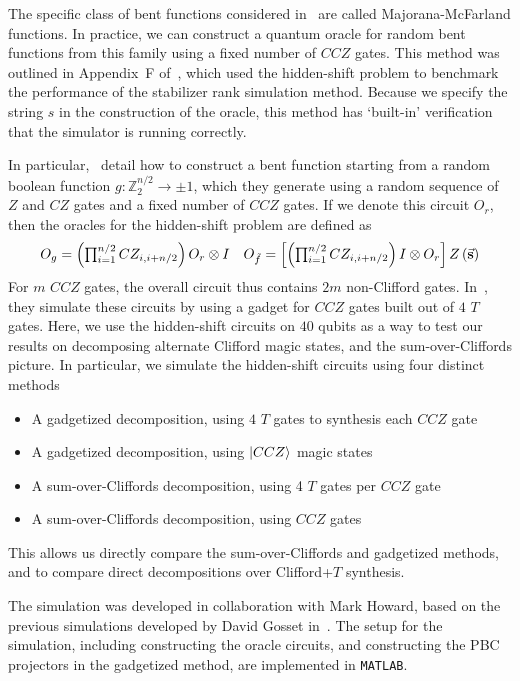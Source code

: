 The specific class of bent functions considered in~\cite{Roetteler2008} are called Majorana-McFarland functions. In practice, we can construct a quantum oracle for random bent functions from this family using a fixed number of $CCZ$ gates. This method was outlined in Appendix~F of~\cite{Bravyi2016}, which used the hidden-shift problem to benchmark the performance of the stabilizer rank simulation method. Because we specify the string $s$ in the construction of the oracle, this method has `built-in' verification that the simulator is running correctly.\par
In particular,~\cite{Bravyi2016} detail how to construct a bent function starting from a random boolean function $g:\mathbb{Z}_{2}^{n/2}\rightarrow \pm 1$, which they generate using a random sequence of $Z$ and $CZ$ gates and a fixed number of $CCZ$ gates. If we denote this circuit $O_{r}$, then the oracles for the hidden-shift problem are defined as
\begin{equation}
\begin{array}{l r}
O_{g} = \left(\prod_{i=1}^{n/2}CZ_{i,i+n/2}\right)O_{r}\otimes I & O_{\tilde{f}} = \left[\left(\prod_{i=1}^{n/2}CZ_{i,i+n/2}\right)I\otimes O_{r}\right] Z\left(\va{s}\right)
\end{array}
\end{equation}
For $m$ $CCZ$ gates, the overall circuit thus contains $2m$ non-Clifford gates. In~\cite{Bravyi2016}, they simulate these circuits by using a gadget for $CCZ$ gates built out of $4$ $T$ gates. Here, we use the hidden-shift circuits on $40$ qubits as a way to test our results on decomposing alternate Clifford magic states, and the sum-over-Cliffords picture. In particular, we simulate the hidden-shift circuits using four distinct methods
\begin{itemize}
    \item A gadgetized decomposition, using $4$ $T$ gates to synthesis each $CCZ$ gate
    \item A gadgetized decomposition, using $\ket{CCZ}$ magic states
    \item A sum-over-Cliffords decomposition, using 4 $T$ gates per $CCZ$ gate
    \item A sum-over-Cliffords decomposition, using $CCZ$ gates
\end{itemize}
This allows us directly compare the sum-over-Cliffords and gadgetized methods, and to compare direct decompositions over Clifford+$T$ synthesis.\par
The simulation was developed in collaboration with Mark Howard, based on the previous simulations developed by David Gosset in~\cite{Bravyi2016}. The setup for the simulation, including constructing the oracle circuits, and constructing the PBC projectors in the gadgetized method, are implemented in \texttt{MATLAB}.\par
